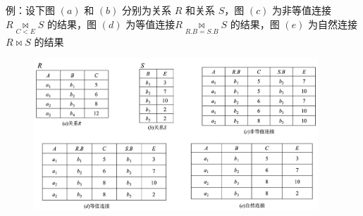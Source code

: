 例：设下图 $(a)$ 和 $(b)$ 分别为关系 $R$ 和关系 $S$，图 $(c)$ 为非等值连接 $R \mathop\bowtie \limits_{C<E} S$ 的结果，图 $(d)$ 为等值连接$R \mathop\bowtie \limits_{R.B=S.B} S$ 的结果，图 $(e)$ 为自然连接 $R \bowtie S$ 的结果
\begin{figure}[H]
    \vspace{-0.5em}
	\centering
	\includegraphics[width=0.95\textwidth]{images/2.3.3.3.1}
    \vspace{-1em}
\end{figure}

